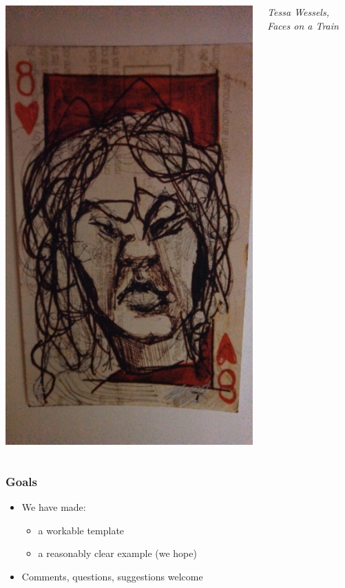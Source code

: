 \documentclass{beamer}
\begin{document}
\begin{frame}
\begin{columns}[c]
\hfill\includegraphics[height=0.8\textheight]{eight.jpg}\hfill\mbox{}

{\small\emph{Tessa Wessels, {\em Faces on a Train}}}

\end{columns}
\end{frame}

\begin{frame}

\frametitle{Goals}

\begin{itemize}

	\item We have made:

	\begin{itemize}

		\item a workable template

		\item a reasonably clear example (we hope)

	\end{itemize}

	\item Comments, questions, suggestions welcome

\end{itemize}

\end{frame}


\end{document}
